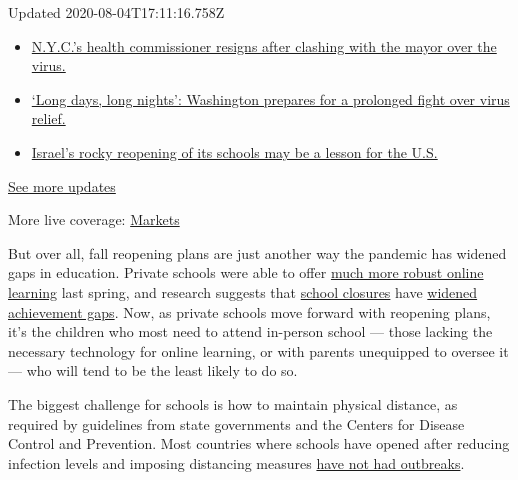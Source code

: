Updated 2020-08-04T17:11:16.758Z

\begin{itemize}
\tightlist
\item
  \href{https://www.nytimes.com/2020/08/04/world/coronavirus-covid-19.html?action=click\&pgtype=Article\&state=default\&region=MAIN_CONTENT_1\&context=storylines_live_updates\#link-4d1eafa8}{N.Y.C.'s
  health commissioner resigns after clashing with the mayor over the
  virus.}
\item
  \href{https://www.nytimes.com/2020/08/04/world/coronavirus-covid-19.html?action=click\&pgtype=Article\&state=default\&region=MAIN_CONTENT_1\&context=storylines_live_updates\#link-6b644638}{`Long
  days, long nights': Washington prepares for a prolonged fight over
  virus relief.}
\item
  \href{https://www.nytimes.com/2020/08/04/world/coronavirus-covid-19.html?action=click\&pgtype=Article\&state=default\&region=MAIN_CONTENT_1\&context=storylines_live_updates\#link-7af9fca0}{Israel's
  rocky reopening of its schools may be a lesson for the U.S.}
\end{itemize}

\href{https://www.nytimes.com/2020/08/04/world/coronavirus-covid-19.html?action=click\&pgtype=Article\&state=default\&region=MAIN_CONTENT_1\&context=storylines_live_updates}{See
more updates}

More live coverage:
\href{https://www.nytimes.com/live/2020/08/04/business/stock-market-today-coronavirus?action=click\&pgtype=Article\&state=default\&region=MAIN_CONTENT_1\&context=storylines_live_updates}{Markets}

But over all, fall reopening plans are just another way the pandemic has
widened gaps in education. Private schools were able to offer
\href{https://www.nytimes.com/2020/05/09/us/coronavirus-public-private-school.html}{much
more robust online learning} last spring, and research suggests that
\href{https://www.nytimes.com/2020/07/29/health/covid-school-reopening.html}{school
closures} have
\href{https://www.nytimes.com/2020/06/05/us/coronavirus-education-lost-learning.html}{widened
achievement gaps}. Now, as private schools move forward with reopening
plans, it's the children who most need to attend in-person school ---
those lacking the necessary technology for online learning, or with
parents unequipped to oversee it --- who will tend to be the least
likely to do so.

The biggest challenge for schools is how to maintain physical distance,
as required by guidelines from state governments and the Centers for
Disease Control and Prevention. Most countries where schools have opened
after reducing infection levels and imposing distancing measures
\href{https://www.nytimes.com/2020/07/11/health/coronavirus-schools-reopen.html}{have
not had outbreaks}.

